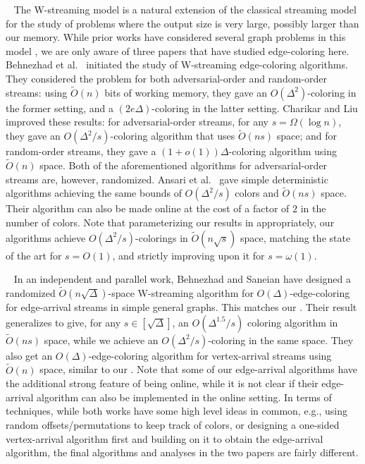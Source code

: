 \documentclass[10pt]{article}
\theoremstyle{definition}\newtheorem{definition}[lemma]{Definition}
\theoremstyle{remark}  \newtheorem*{remark}{Remark}
\newcommand{\tO}{\widetilde{O}}
\newcommand{\mypar}[1]{\medskip\noindent{\bfseries #1.}~}
\begin{document}
\mypar{W-Streaming model} The W-streaming model \cite{DemetrescuFR06} is a natural extension of the classical streaming model for the study of problems where the output size is very large, possibly larger than our memory. While prior works have considered several graph problems in this model \cite{DemetrescuFR06, DemetrescuEMR10, LauraS11, GlazikSS22}, we are only aware of three papers \cite{BehnezhadDHKS19, CharikarL21, AnsariSZ22} that have studied edge-coloring here. Behnezhad et al.~\cite{BehnezhadDHKS19} initiated the study of W-streaming edge-coloring algorithms. They considered the problem for both adversarial-order and random-order streams: using $\tO(n)$ bits of working memory, they gave an $O(\Delta^2)$-coloring in the former setting, and a $(2e\Delta)$-coloring in the latter setting. Charikar and Liu \cite{CharikarL21} improved these results: for adversarial-order streams, for any $s=\Omega(\log n)$, they gave an $O(\Delta^2/s)$-coloring algorithm that uses $\tO(ns)$ space; and for random-order streams, they gave a $(1+o(1))\Delta$-coloring algorithm using $\tO(n)$ space. Both of the aforementioned algorithms for adversarial-order streams are, however, randomized. Ansari et al.~\cite{AnsariSZ22} gave simple deterministic algorithms achieving the same bounds of $O(\Delta^2/s)$ colors and $\tO(ns)$ space. Their algorithm can also be made online at the cost of a factor of $2$ in the number of colors. Note that parameterizing our results in  appropriately, our algorithms achieve $O(\Delta^2/s)$-colorings in $\tO(n\sqrt{s})$ space, matching the state of the art for $s=O(1)$, and strictly improving upon it for $s=\omega(1)$.    


\mypar{Concurrent work} In an independent and parallel work, Behnezhad and Saneian \cite{BehnezhadS23} have designed a randomized $\tO(n\sqrt{\Delta})$-space W-streaming algorithm for $O(\Delta)$-edge-coloring for edge-arrival streams in simple general graphs. This matches our . Their result generalizes to give, for any $s \in [\sqrt{\Delta}]$, an $O(\Delta^{1.5} / s)$ coloring algorithm in $\tO(n s)$ space, while we achieve an $O(\Delta^2 / s)$-coloring in the same space. They also get an $O(\Delta)$-edge-coloring algorithm for vertex-arrival streams using $\tO(n)$ space, similar to our . Note that some of our edge-arrival algorithms have the additional strong feature of being online, while it is not clear if their edge-arrival algorithm can also be implemented in the online setting. 
In terms of techniques, while both works have some high level ideas in common, e.g., using random offsets/permutations to keep track of colors, or designing a one-sided vertex-arrival algorithm first and building on it to obtain the edge-arrival algorithm, the final algorithms and analyses in the two papers are fairly different.
\end{document}
